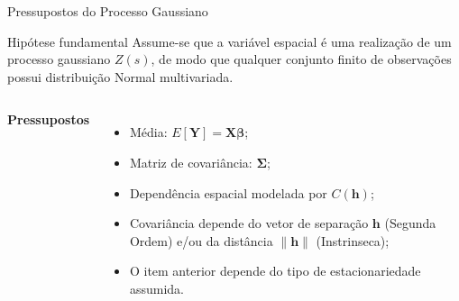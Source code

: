 \documentclass{beamer}
\begin{document}
\begin{frame}{Pressupostos do Processo Gaussiano}

    \begin{block}{Hipótese fundamental}
    Assume-se que a variável espacial é uma realização de um processo gaussiano
    $Z(s)$, de modo que qualquer conjunto finito de observações possui
    distribuição Normal multivariada.
    \end{block}

    \begin{columns}[T]


        \textbf{Pressupostos}

        \begin{itemize}
            \item Média: \(E[\mathbf{Y}] = \mathbf{X}\boldsymbol{\beta}\);
            \item Matriz de covariância: \(\boldsymbol{\Sigma}\);
            \item Dependência espacial modelada por \(C(\mathbf{h})\);
            \item Covariância depende do vetor de separação \(\mathbf{h}\) (Segunda Ordem) e/ou da distância \(\|\mathbf{h}\|\) (Instrinseca);
            \item O item anterior depende do tipo de estacionariedade assumida.
        \end{itemize}

        \centering


    \end{columns}
\end{frame}
\end{document}
